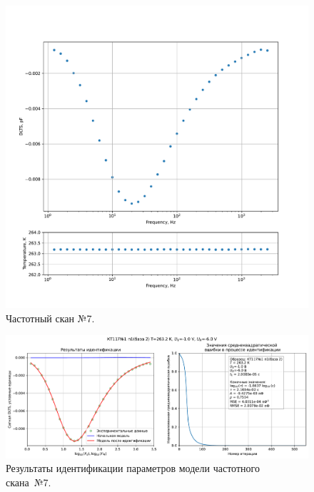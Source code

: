 \begin{figure}[!ht]
    \centering
    \includegraphics[width=1\textwidth]{../plots/КТ117№1_п1(база 2)_2500Гц-1Гц_1пФ_-10С_-1В-6В_200мВ_20мкс_шаг_0,1.pdf}
    \caption{Частотный скан №7.}
    \label{pic:frequency_scan_7}
\end{figure}

\begin{figure}[!ht]
    \centering
    \includegraphics[width=1\textwidth]{../plots/КТ117№1_п1(база 2)_2500Гц-1Гц_1пФ_-10С_-1В-6В_200мВ_20мкс_шаг_0,1_model.pdf}
    \caption{Результаты идентификации параметров модели частотного скана~№7.}
    \label{pic:frequency_scan_model7}
\end{figure}

\pagebreak



